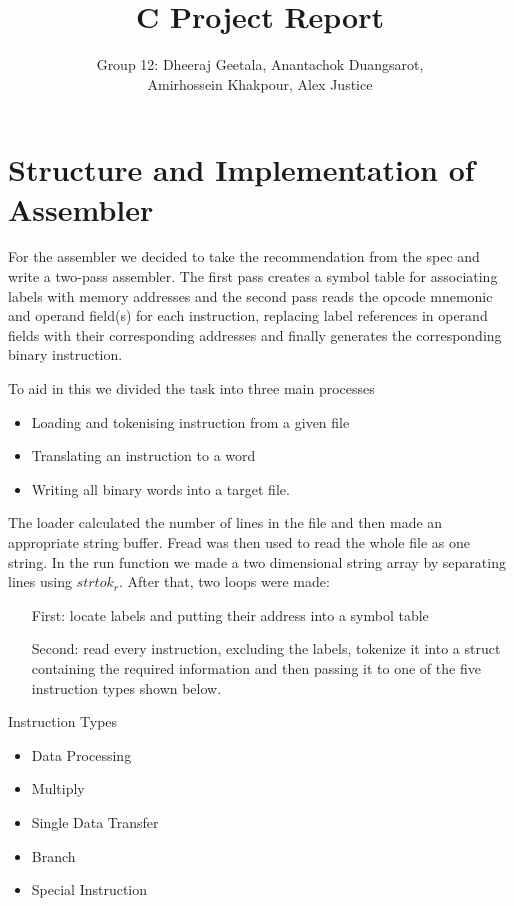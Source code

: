 \documentclass[a4paper,12pt]{article}
\begin{document}
\title{ C Project Report }
\author{Group 12: Dheeraj Geetala, Anantachok Duangsarot, \\Amirhossein Khakpour, Alex Justice}
\predate{}
\date{}
\postdate{}
\maketitle

\section{Structure and Implementation of Assembler}

For the assembler we decided to take the recommendation from the spec and write a two-pass assembler. The first pass creates a symbol table for associating labels with memory addresses and the second pass reads the opcode mnemonic and operand field(s) for each instruction, replacing label references in operand fields with their corresponding addresses and finally generates the corresponding binary instruction.

To aid in this we divided the task into three main processes
\begin{itemize}
\item Loading and tokenising instruction from a given file
\item Translating an instruction to a word 
\item Writing all binary words into a target file.
\end{itemize}

The loader calculated the number of lines in the file and then made an appropriate string buffer. Fread was then used to read the whole file as one string. In the run function we made a two dimensional string array by separating lines using $strtok_r$. After that, two loops were made:
\begin{itemize}
\item[First:] locate labels and putting their address into a symbol table
\item[Second:] read every instruction, excluding the labels, tokenize it into a struct containing the required information and then passing it to one of the five instruction types shown below. 
\end{itemize}


Instruction Types
\begin{itemize}
\item Data Processing
\item Multiply
\item Single Data Transfer
\item Branch
\item Special Instruction
\end{itemize}
\end{document}
